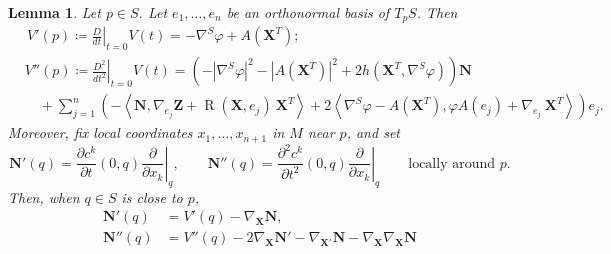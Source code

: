 \documentclass[11pt]{amsart}
\newcommand{\n}[1]{\nabla^\varepsilon_{ #1 }}
\newcommand{\rr}{{\mathbb{R}}}
\newcommand{\N}{\mathcal N}
\newcommand{\X}{\mathbf{X}}
\newcommand{\Z}{\mathbf{Z}}
\renewcommand{\n}{\mathbf{N}}
\DeclareMathOperator{\R}{R}
\newtheorem{lemma}[theorem]{Lemma}
\theoremstyle{definition}
\theoremstyle{remark}
\numberwithin{equation}{section}
\begin{document}
\begin{lemma}
    Let $p\in S$. 
    Let $e_1,\ldots,e_n$ be an orthonormal basis of $T_p S$. Then
    \begin{align}
        &\,V'(p)\coloneqq \left.\frac{D}{dt}\right|_{t=0}V(t)=-\nabla^S\varphi+ A\left( \X^T\right) ; \label{lemma125ritore}\\
          &V''(p)\coloneqq \left.\frac{D^2}{dt^2}\right|_{t=0}V(t)=\left(-\left|\nabla^S\varphi\right|^2-\left|A\left(\X ^T\right)\right|^2+2 h\left( \X^T,\nabla^S\varphi\right)\right)\n\label{secondordernormalbehave}\\
         &\quad+\sum_{j=1}^n\left(-\left \langle \n ,\nabla_{e_j}\Z+\R(\X,e_j)\ \X^T\right\rangle+2\left\langle \nabla^S\varphi- A\left( \X^T\right) ,\varphi A(e_j)+\nabla_{e_j}\ \X^T\right\rangle\right)e_j.\nonumber
    \end{align}
    Moreover, fix local coordinates $x_1,\ldots,x_{n+1}$ in $M$ near $p$, and set 
    \begin{equation*}
        \n'(q)=\frac{\partial c^k}{\partial t}(0,q)\left.\frac{\partial}{\partial x_k}\right|_q,\qquad \n''(q)=\frac{\partial^2 c^k}{\partial t^2}(0,q)\left.\frac{\partial}{\partial x_k}\right|_q\qquad\text{locally around $p$.}
    \end{equation*}
 Then, when $q\in S$ is close to $p$,
 \begin{align}
        \n'(q)&=V'(q)-\nabla_\X \n, \label{piccolopezzodercovnorm}\\
        \n''(q)&    =V''(q)-2\nabla_\X\n'-\nabla_{\X'}\n-\nabla_\X\nabla_\X \n\label{pezzocondtquadrockappa}
 \end{align}
\end{lemma}
\end{document}
